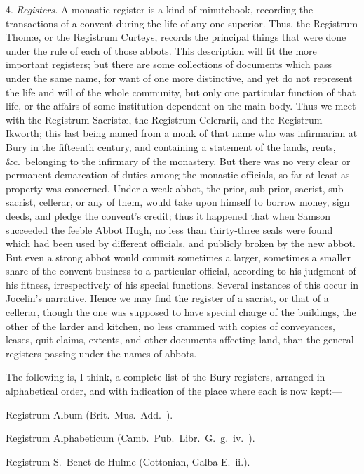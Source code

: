 \documentclass[10pt]{book}
\begin{document}
{4. \emph{Registers.} A monastic register is a kind of minutebook, recording the transactions of a convent during the life of any one superior. Thus, the Registrum Thom\ae{}, or the Registrum Curteys, records the principal things that were done under the rule of each of those abbots. This description will fit the more important registers; but there are some collections of documents which pass under the same name, for want of one more distinctive, and yet do not represent the life and will of the whole community, but only one particular function of that life, or the affairs of some institution dependent on the main body. Thus we meet with the Registrum Sacrist\ae{}, the Registrum Celerarii, and the Registrum Ikworth; this last being named from a monk of that name who was infirmarian at Bury in the fifteenth century, and containing a statement of the lands, rents, \&c.\ belonging to the infirmary of the monastery. But there was no very clear or permanent demarcation of duties among the monastic officials, so far at least as property was concerned. Under a weak abbot, the prior, sub-prior, sacrist, sub-sacrist, cellerar, or any of them, would take upon himself to borrow money, sign deeds, and pledge the convent's credit; thus it happened that when Samson succeeded the feeble Abbot Hugh, no less than thirty-three seals were found which had been used by different officials, and publicly broken by the new abbot. But even a strong abbot would commit sometimes a larger, sometimes a smaller share of the convent business to a particular official, according to his judgment of his fitness, irrespectively of his special functions. Several instances of this occur in Jocelin's narrative. Hence we may find the register of a sacrist, or that of a cellerar, though the one was supposed to have special charge of the buildings, the other of the larder and kitchen, no less crammed with copies of conveyances, leases, quit-claims, extents, and other documents affecting land, than the general registers passing under the names of abbots.

The following is, I think, a complete list of the Bury registers, arranged in alphabetical order, and with indication of the place where each is now kept:---

Registrum Album (Brit.\ Mus.\ Add.\ ).

Registrum Alphabeticum (Camb.\ Pub.\ Libr.\ G.\ g.\ iv.\ ).

Registrum S.\ Benet de Hulme (Cottonian, Galba E.\ ii.).

}
\end{document}
